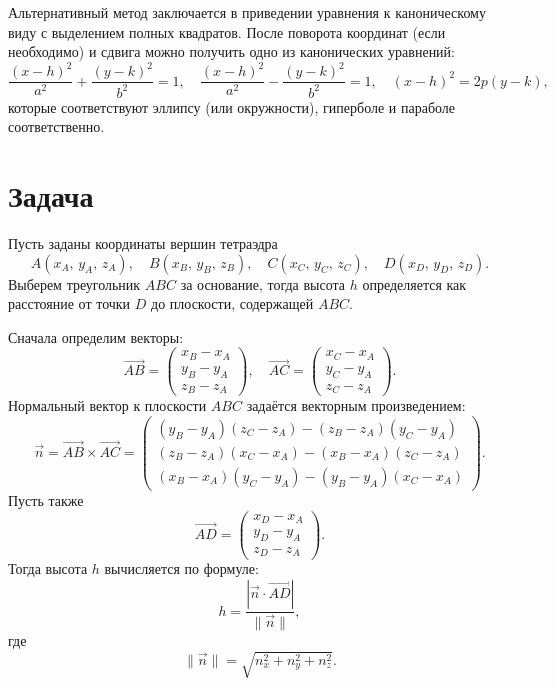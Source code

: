 \documentclass[a4paper,14pt]{extreport} %
\begin{document}
Альтернативный метод заключается в приведении уравнения к каноническому виду с выделением полных квадратов. После поворота координат (если необходимо) и сдвига можно получить одно из канонических уравнений:
\[
\frac{(x-h)^2}{a^2}+\frac{(y-k)^2}{b^2}=1, \quad \frac{(x-h)^2}{a^2}-\frac{(y-k)^2}{b^2}=1, \quad (x-h)^2=2p(y-k),
\]
которые соответствуют эллипсу (или окружности), гиперболе и параболе соответственно.
%


\section*{Задача}
Пусть заданы координаты вершин тетраэдра
\[
A(x_A,\, y_A,\, z_A),\quad B(x_B,\, y_B,\, z_B),\quad C(x_C,\, y_C,\, z_C),\quad D(x_D,\, y_D,\, z_D).
\]
Выберем треугольник \(ABC\) за основание, тогда высота \(h\) определяется как расстояние от точки \(D\) до плоскости, содержащей \(ABC\).

Сначала определим векторы:
\[
\vec{AB} = \begin{pmatrix} x_B - x_A \\[1mm] y_B - y_A \\[1mm] z_B - z_A \end{pmatrix}, \quad
\vec{AC} = \begin{pmatrix} x_C - x_A \\[1mm] y_C - y_A \\[1mm] z_C - z_A \end{pmatrix}.
\]
Нормальный вектор к плоскости \(ABC\) задаётся векторным произведением:
\[
\vec{n} = \vec{AB} \times \vec{AC} =
\begin{pmatrix}
(y_B - y_A)(z_C - z_A) - (z_B - z_A)(y_C - y_A)\\[1mm]
(z_B - z_A)(x_C - x_A) - (x_B - x_A)(z_C - z_A)\\[1mm]
(x_B - x_A)(y_C - y_A) - (y_B - y_A)(x_C - x_A)
\end{pmatrix}.
\]
Пусть также
\[
\vec{AD} = \begin{pmatrix} x_D - x_A \\[1mm] y_D - y_A \\[1mm] z_D - z_A \end{pmatrix}.
\]
Тогда высота \(h\) вычисляется по формуле:
\[
h = \frac{\left| \vec{n} \cdot \vec{AD} \right|}{\|\vec{n}\|},
\]
где
\[
\|\vec{n}\| = \sqrt{n_x^2 + n_y^2 + n_z^2}.
\]
\end{document}
